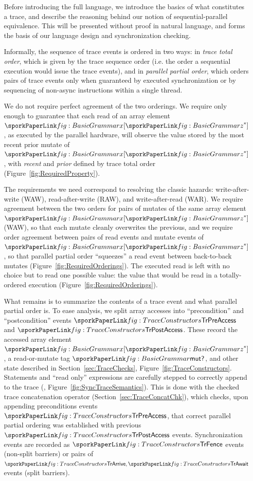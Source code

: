
Before introducing the full language,
we introduce the basics of what constitutes a trace,
and describe the reasoning behind our notion of sequential-parallel equivalence.
This will be presented without proof in natural language,
and forms the basis of our language design and synchronization checking.

Informally, the sequence of trace events is ordered in two ways:
in \emph{trace total order}, which is given by the trace sequence order
(i.e. the order a sequential execution would issue the trace events),
and in \emph{parallel partial order},
which orders pairs of trace events only when guaranteed by executed synchronization or by sequencing of non-async instructions within a single thread.

We do not require perfect agreement of the two orderings.
We require only enough to guarantee that each read of an array element $\sporkx[\sporkz^*]$,
as executed by the parallel hardware,
will observe the value stored by the most recent prior mutate of $\sporkx[\sporkz^*]$,
with \emph{recent} and \emph{prior} defined by trace total order (Figure~\ref{fig:RequiredProperty}).



The requirements we need correspond to resolving the classic hazards:
write-after-write (WAW), read-after-write (RAW), and write-after-read (WAR).
We require agreement between the two orders for pairs of mutates of the same array element $\sporkx[\sporkz^*]$ (WAW),
so that each mutate cleanly overwrites the previous,
and we require order agreement between pairs of read events and mutate events of $\sporkx[\sporkz^*]$,
so that parallel partial order ``squeezes'' a read event between back-to-back mutates (Figure~\ref{fig:RequiredOrderings}).
The executed read is left with no choice but to read one possible value:
the value that would be read in a totally-ordered execution (Figure~\ref{fig:RequiredOrderings}).



What remains is to summarize the contents of a trace event and what parallel partial order is.
To ease analysis,  %
we split array accesses into ``precondition'' and ``postcondition'' events $\sporkTrPreAccess$ and $\sporkTrPostAccess$.
These record the accessed array element $\sporkx[\sporkz^*]$,
a read-or-mutate tag $\sporkmut$,
and other state described in Section~\ref{sec:TraceChecks}, Figure~\ref{fig:TraceConstructors}.
Statements and ``read only'' expressions are carefully stepped to correctly append to the trace
(\sporkTrRead, Figure~\ref{fig:SyncTraceSemantics}).
This is done with the checked trace concatenation operator (Section~\ref{sec:TraceConcatChk}),
which checks, upon appending preconditions events $\sporkTrPreAccess$,
that correct parallel partial ordering was established with previous $\sporkTrPostAccess$ events.
Synchronization events are recorded as $\sporkTrFence$ events (non-split barriers)
or pairs of $\sporkTrArrive,\sporkTrAwait$ events (split barriers).

